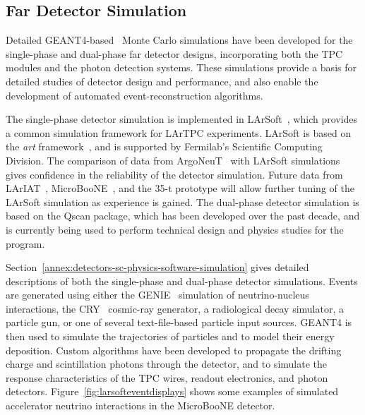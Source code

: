 \subsection{Far Detector Simulation}
\label{sec:detectors-sc-physics-software-simulation-fd}

Detailed GEANT4-based~\cite{GEANT4:NIM,GEANT4} Monte Carlo simulations have been 
developed for the single-phase and dual-phase far detector designs,
incorporating both the %
TPC modules
and the photon detection systems. These simulations provide
a basis for detailed studies of detector design and performance, 
and also enable the development of automated event-reconstruction algorithms.

The single-phase detector simulation is implemented in LArSoft~\cite{Church:2013hea},
which provides a common simulation framework for LArTPC experiments.
LArSoft is based on the {\it art} framework~\cite{Green:2012gv}, and is supported by Fermilab's
Scientific Computing Division.
The comparison of data from ArgoNeuT~\cite{Anderson:2012vc} with LArSoft
simulations gives confidence in the reliability of the detector simulation.
Future data from LArIAT~\cite{Adamson:2013/02/28tla,Cavanna:2014iqa},
MicroBooNE~\cite{Chen:2007ae,Jones:2011ci,microboonecdr}, and the 35-t prototype will allow
further tuning of the LArSoft simulation as experience is gained.
The dual-phase detector simulation is based on the Qscan package,
which has been developed over the past decade, and is currently
being used to perform technical design and physics studies for
the \cerndualproto{} program.

Section~\ref{annex:detectors-sc-physics-software-simulation} gives detailed
descriptions of both the single-phase and dual-phase detector simulations.
Events are generated using either the GENIE~\cite{GENIE} simulation of 
neutrino-nucleus interactions, the CRY~\cite{Cosmic-CRY,Cosmic-CRY-protons,CRY-url} cosmic-ray generator, 
a radiological decay simulator, a particle gun, or one of several
text-file-based particle input sources. GEANT4 is then used to simulate the trajectories
of particles and to model their energy deposition.  
Custom algorithms have been developed to propagate the drifting charge
and scintillation photons through the detector, and to simulate the
response characteristics of the TPC wires, readout electronics, and photon detectors.
Figure~\ref{fig:larsofteventdisplays} shows some examples of simulated 
accelerator neutrino interactions in the MicroBooNE detector.

